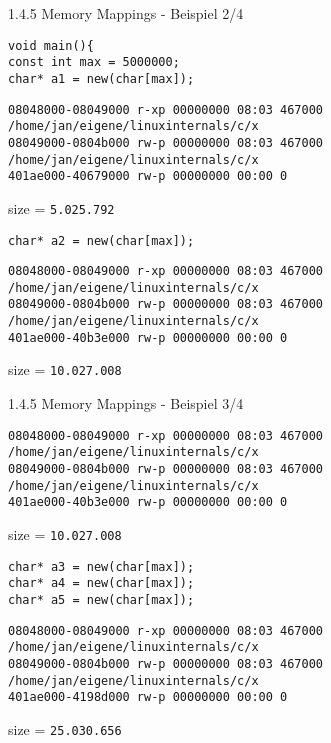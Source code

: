 \documentclass[landscape]{slides}
\begin{document}
\begin{slide}{1.4.5 Memory Mappings - Beispiel 2/4}

\normalsize{\texttt{void main()\{\\const int max = 5000000;\\char* a1 = new(char[max]);}}\\
\small{
\begin{verbatim}
08048000-08049000 r-xp 00000000 08:03 467000     /home/jan/eigene/linuxinternals/c/x
08049000-0804b000 rw-p 00000000 08:03 467000     /home/jan/eigene/linuxinternals/c/x
401ae000-40679000 rw-p 00000000 00:00 0
\end{verbatim}
}
size = \texttt{5.025.792}

\normalsize{\texttt{char* a2 = new(char[max]);}}
\small{
\begin{verbatim}
08048000-08049000 r-xp 00000000 08:03 467000     /home/jan/eigene/linuxinternals/c/x
08049000-0804b000 rw-p 00000000 08:03 467000     /home/jan/eigene/linuxinternals/c/x
401ae000-40b3e000 rw-p 00000000 00:00 0
\end{verbatim}
}
size = \texttt{10.027.008}
\end{slide}
%
%
%
\begin{slide}{1.4.5 Memory Mappings - Beispiel 3/4}
\small{
\begin{verbatim}
08048000-08049000 r-xp 00000000 08:03 467000     /home/jan/eigene/linuxinternals/c/x
08049000-0804b000 rw-p 00000000 08:03 467000     /home/jan/eigene/linuxinternals/c/x
401ae000-40b3e000 rw-p 00000000 00:00 0
\end{verbatim}
}
size = \texttt{10.027.008}

\normalsize{
		  \texttt{char* a3 = new(char[max]);}\\
		  \texttt{char* a4 = new(char[max]);}\\
		  \texttt{char* a5 = new(char[max]);}
}
\small{
\begin{verbatim}
08048000-08049000 r-xp 00000000 08:03 467000     /home/jan/eigene/linuxinternals/c/x
08049000-0804b000 rw-p 00000000 08:03 467000     /home/jan/eigene/linuxinternals/c/x
401ae000-4198d000 rw-p 00000000 00:00 0
\end{verbatim}
}
size = \texttt{25.030.656}
\end{slide}
%
%
\end{document}
